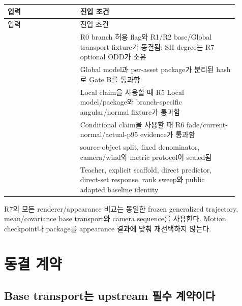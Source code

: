 \documentclass[10pt]{article}
\begin{document}
\begin{longtable}{L{0.29\linewidth}L{0.61\linewidth}}
\toprule
입력 & 진입 조건\\
\midrule
\endfirsthead
\toprule
입력 & 진입 조건\\
\midrule
\endhead
{}\newline{} & R0 branch 허용 flag와 R1/R2 base/Global transport fixture가 동결됨; SH degree는 R7 optional ODD가 소유\\
\newline{}\newline{} & Global model과 per-asset package가 분리된 hash로 Gate B를 통과함\\
\newline{}\newline{} & Local claim을 사용할 때 R5 Local model/package와 branch-specific angular/normal fixture가 통과함\\
\newline{}\newline{} & Conditional claim을 사용할 때 R6 fade/current-normal/actual-p95 evidence가 통과함\\
\newline{}\newline{} & source-object split, fixed denominator, camera/wind와 metric protocol이 sealed됨\\
 & Teacher, explicit scaffold, direct predictor, direct-set response, rank sweep와 public adapted baseline identity\\
\bottomrule
\end{longtable}

R7의 모든 renderer/appearance 비교는 동일한 frozen generalized trajectory, mean/covariance base transport와
camera sequence를 사용한다. Motion checkpoint나 package를 appearance 결과에 맞춰 재선택하지 않는다.

\section{동결 계약}
\label{sec:r7-chapter-3}

\subsection{Base transport는 upstream 필수 계약이다}
\end{document}
